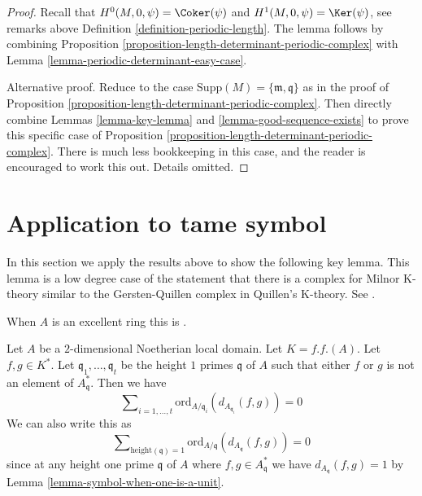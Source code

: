 \begin{proof}
Recall that $H^0(M, 0, \psi) = \Coker(\psi)$ and
$H^1(M, 0, \psi) = \Ker(\psi)$, see remarks above
Definition \ref{definition-periodic-length}.
The lemma follows by combining
Proposition \ref{proposition-length-determinant-periodic-complex} with
Lemma \ref{lemma-periodic-determinant-easy-case}.

\medskip\noindent
Alternative proof. Reduce to the case
$\text{Supp}(M) = \{\mathfrak m, \mathfrak q\}$
as in the proof of
Proposition \ref{proposition-length-determinant-periodic-complex}.
Then directly combine
Lemmas \ref{lemma-key-lemma} and
\ref{lemma-good-sequence-exists}
to prove this specific case of
Proposition \ref{proposition-length-determinant-periodic-complex}.
There is much less bookkeeping in this case, and the reader is
encouraged to work this out. Details omitted.
\end{proof}











\section{Application to tame symbol}
\label{section-application-tame-symbol}

\noindent
In this section we apply the results above to show the following key lemma.
This lemma is a low degree case of the statement that there is a complex
for Milnor K-theory similar to the Gersten-Quillen complex in Quillen's
K-theory. See \cite{Kato-Milnor-K}.

\begin{lemma}
\label{lemma-secondary-ramification}
\begin{reference}
When $A$ is an excellent ring this is \cite[Proposition 1]{Kato-Milnor-K}.
\end{reference}
Let $A$ be a $2$-dimensional Noetherian local domain.
Let $K = f.f.(A)$. Let $f, g \in K^*$.
Let $\mathfrak q_1, \ldots, \mathfrak q_t$ be the height
$1$ primes $\mathfrak q$ of $A$ such that either $f$ or $g$ is not an
element of $A^*_{\mathfrak q}$.
Then we have
$$
\sum\nolimits_{i = 1, \ldots, t}
\text{ord}_{A/\mathfrak q_i}(d_{A_{\mathfrak q_i}}(f, g))
=
0
$$
We can also write this as
$$
\sum\nolimits_{\text{height}(\mathfrak q) = 1}
\text{ord}_{A/\mathfrak q}(d_{A_{\mathfrak q}}(f, g))
=
0
$$
since at any height one prime $\mathfrak q$
of $A$ where $f, g \in A^*_{\mathfrak q}$
we have $d_{A_{\mathfrak q}}(f, g) = 1$ by
Lemma \ref{lemma-symbol-when-one-is-a-unit}.
\end{lemma}

